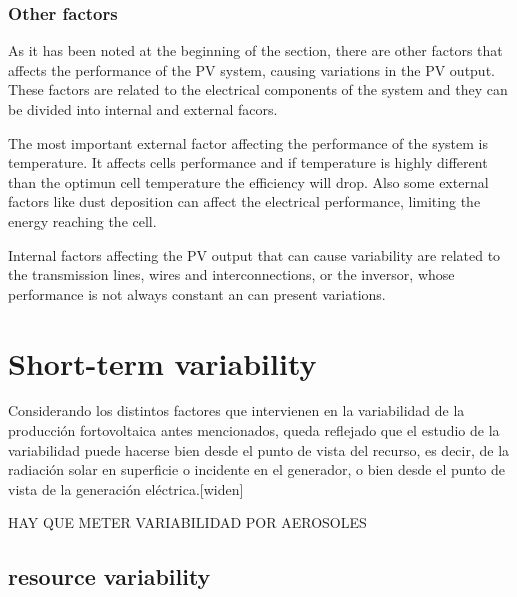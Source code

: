 \subsubsection{Other factors}

As it has been noted at the beginning of the section, there are other factors that affects the performance of the PV system, causing variations in the PV output. These factors are related to the electrical components of the system and they can be divided into internal and external facors.

The most important external factor affecting the performance of the system is temperature. It affects cells performance and if temperature is highly different than the optimun cell temperature the efficiency will drop. Also some external factors like dust deposition can affect the electrical performance, limiting the energy reaching the cell.

Internal factors affecting the PV output that can cause variability are related to the transmission lines, wires and interconnections, or the inversor, whose performance is not always constant an can present variations.

\section{Short-term variability}%

Considerando los distintos factores que intervienen en la variabilidad de la producción fortovoltaica antes mencionados, queda reflejado que el estudio de la variabilidad puede hacerse bien desde el punto de vista del recurso, es decir, de la radiación solar en superficie o incidente en el generador, o bien desde el punto de vista de la generación eléctrica.[widen]
 
{\color{blue} HAY QUE METER VARIABILIDAD POR AEROSOLES}
\subsection{resource variability}

